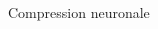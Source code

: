 \documentclass[9pt, aspectratio=169]{beamer}
\begin{document}
\begin{frame}{Compression neuronale} %
\begin{columns}
   \begin{column}{0.48\textwidth}
   \end{column}
   \begin{column}{0.48\textwidth}
   \end{column}
\end{columns}
\end{frame}


%
\end{document}
